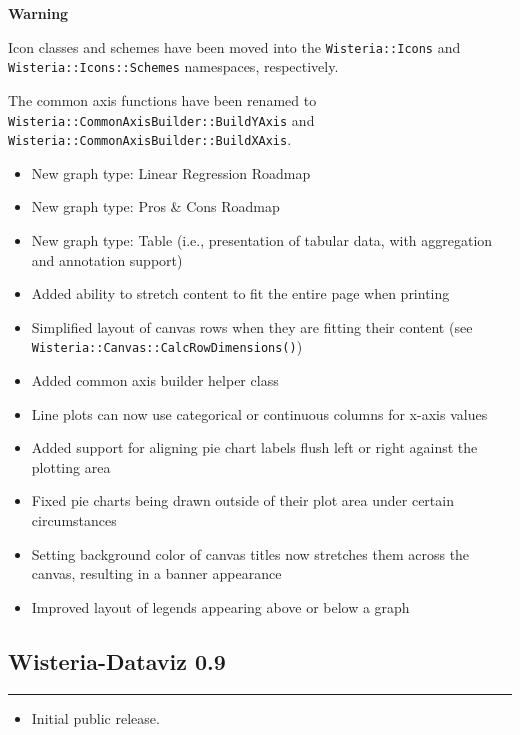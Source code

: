 \documentclass[
]{scrartcl}
\providecommand{\tightlist}{%
  \setlength{\itemsep}{0pt}\setlength{\parskip}{0pt}}
\newenvironment{warningsection}
    {
    \begin{tcolorbox}[colframe=lightgray,colback=lightpink,arc=3mm]
    \faExclamationTriangle[solid] \textbf{{Warning} } \newline
    }
    {
    \end{tcolorbox}
    }
\begin{document}
\begin{warningsection}
Icon classes and schemes have been moved into the
\texttt{Wisteria::Icons} and \texttt{Wisteria::Icons::Schemes}
namespaces, respectively.

The common axis functions have been renamed to
\texttt{Wisteria::CommonAxisBuilder::BuildYAxis} and
\texttt{Wisteria::CommonAxisBuilder::BuildXAxis}.

\end{warningsection}

\begin{itemize}
\tightlist
\item
  New graph type: Linear Regression Roadmap
\item
  New graph type: Pros \& Cons Roadmap
\item
  New graph type: Table (i.e., presentation of tabular data, with
  aggregation and annotation support)
\item
  Added ability to stretch content to fit the entire page when printing
\item
  Simplified layout of canvas rows when they are fitting their content
  (see \texttt{Wisteria::Canvas::CalcRowDimensions()})
\item
  Added common axis builder helper class
\item
  Line plots can now use categorical or continuous columns for x-axis
  values
\item
  Added support for aligning pie chart labels flush left or right
  against the plotting area
\item
  Fixed pie charts being drawn outside of their plot area under certain
  circumstances
\item
  Setting background color of canvas titles now stretches them across
  the canvas, resulting in a banner appearance
\item
  Improved layout of legends appearing above or below a graph
\end{itemize}

\subsection*{Wisteria-Dataviz 0.9}\label{section-14}

\begin{center}\rule{0.5\linewidth}{0.5pt}\end{center}

\begin{itemize}
\tightlist
\item
  Initial public release.
\end{itemize}
\end{document}
